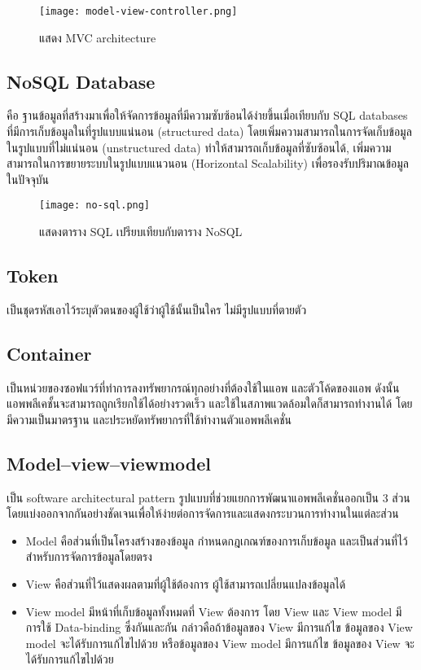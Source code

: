 \begin{figure}[H]
  \centering
  \texttt{[image: model-view-controller.png]}
  \caption{แสดง MVC architecture}
  \label{Fig:model-view-controller}
\end{figure}

\subsection{NoSQL Database}

คือ ฐานข้อมูลที่สร้างมาเพื่อให้จัดการข้อมูลที่มีความซับซ้อนได้ง่ายขึ้นเมื่อเทียบกับ SQL databases ที่มีการเก็บข้อมูลในที่รูปแบบแน่นอน (structured data) โดยเพิ่มความสามารถในการจัดเก็บข้อมูลในรูปแบบที่ไม่แน่นอน (unstructured data)  ทำให้สามารถเก็บข้อมูลที่ซับซ้อนได้, เพิ่มความสามารถในการขยายระบบในรูปแบบแนวนอน (Horizontal Scalability) เพื่อรองรับปริมาณข้อมูลในปัจจุบัน~\cite{nosql}
\begin{figure}[H]
  \centering
  \texttt{[image: no-sql.png]}
  \caption{แสดงตาราง SQL เปรียบเทียบกับตาราง NoSQL}
  \label{Fig:no-sql}
\end{figure}

\subsection{Token}

เป็นชุดรหัสเอาไว้ระบุตัวตนของผู้ใช้ว่าผู้ใช้นั้นเป็นใคร ไม่มีรูปแบบที่ตายตัว

\subsection{Container}

เป็นหน่วยของซอฟแวร์ที่ทำการลงทรัพยากรณ์ทุกอย่างที่ต้องใช้ในแอพ และตัวโค้ดของแอพ ดังนั้นแอพพลีเคชั้นจะสามารถถูกเรียกใช้ได้อย่างรวดเร็ว และใช้ในสภาพแวดล้อมใดก็สามารถทำงานได้ โดยมีความเป็นมาตรฐาน และประหยัดทรัพยากรที่ใช้ทำงานตัวแอพพลีเคชั่น~\cite{container}

\subsection{Model–view–viewmodel}

เป็น software architectural pattern รูปแบบที่ช่วยแยกการพัฒนาแอพพลีเคชั่นออกเป็น 3 ส่วน โดยแบ่งออกจากกันอย่างชัดเจนเพื่อให้ง่ายต่อการจัดการและแสดงกระบวนการทำงานในแต่ละส่วน~\cite{mvvm}

\begin{itemize}
  \item Model คือส่วนที่เป็นโครงสร้างของข้อมูล กำหนดกฎเกณฑ์ของการเก็บข้อมูล  และเป็นส่วนที่ไว้สำหรับการจัดการข้อมูลโดยตรง
  \item View คือส่วนที่ไว้แสดงผลตามที่ผู้ใช้ต้องการ ผู้ใช้สามารถเปลี่ยนแปลงข้อมูลได้
  \item View model มีหน้าที่เก็บข้อมูลทั้งหมดที่ View ต้องการ โดย View และ View model มีการใช้ Data-binding ซึ่งกันและกัน กล่าวคือถ้าข้อมูลของ View มีการแก้ไข ข้อมูลของ View model จะได้รับการแก้ไขไปด้วย หรือข้อมูลของ View model มีการแก้ไข ข้อมูลของ View จะได้รับการแก้ไขไปด้วย
\end{itemize}

